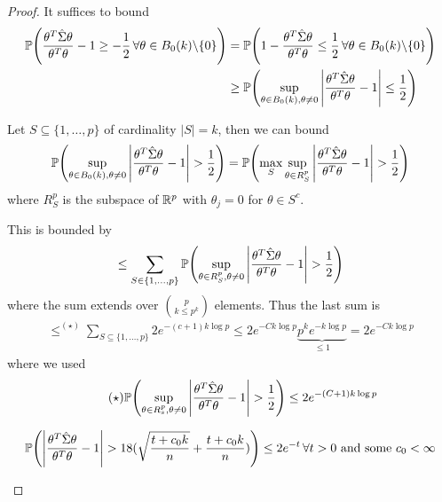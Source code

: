 \begin{proof}
  It suffices to bound
  \begin{align}
    \label{eq:152}
    \Prob{\frac{\theta^{T} \hat \Sigma \theta}{\theta^{T} \theta} -1 \geq
    -\frac{1}{2} \, \forall \theta \in B_{0}(k) \backslash \{ 0 \}} &=
  \Prob{1- \frac{\theta^{T} \hat \Sigma \theta}{\theta^{T} \theta}
    \leq \frac{1}{2} \, \forall \theta \in B_{0}(k) \backslash \{ 0
    \}} \\
  &\geq \Prob{\sup_{\theta \in B_{0}(k), \theta \neq 0} \left|
      \frac{\theta^{T} \hat \Sigma \theta}{\theta^{T} \theta} - 1 \right|
    \leq \frac{1}{2}}
  \end{align}

  Let $S \subseteq  \{ 1, \dots, p \}$ of cardinality $|S| = k$, then
  we can bound
  \begin{align}
    \label{eq:153}
    \Prob{ \sup_{\theta \in B_{0}(k), \theta \neq 0} \left|
        \frac{\theta^{T} \hat \Sigma \theta}{\theta^{T} \theta} - 1
      \right| > \frac{1}{2}} = \Prob{\max_{S} \sup_{\theta \in
        R^{p}_{S}} \left| \frac{\theta^{T} \hat \Sigma
          \theta}{\theta^{T} \theta} - 1 \right| > \frac{1}{2}}
  \end{align} where $R^{p}_{S}$ is the subspace of $\mathbb{R}^{p}$ with
  $\theta_{j} = 0$ for $\theta \in S^{c}$.

  This is bounded by
  \begin{align}
    \label{eq:154}
    \leq \sum_{S \in \{ 1, \dots, p \}} \Prob{\sup_{\theta \in
        R^{p}_{S}, \theta \neq 0} \left| \frac{\theta^{T} \hat \Sigma
          \theta}{\theta^{T} \theta} - 1 \right| > \frac{1}{2}}
  \end{align} where the sum extends over $p \choose k \leq p^{k}$
  elements.  Thus the last sum is
  \begin{align}
    \label{eq:155}
    \leq^{(\star)} \sum_{S \subseteq \{ 1, \dots, p \}} 2e^{-(c+1) k
      \log p} \leq 2 e^{-C k \log p} \underbrace{p^{k} e^{-k \log
        p}}_{\leq 1} = 2e^{-Ck\log p}
  \end{align} where we used
  \begin{align}
    \label{eq:156}
    \tag{$\star$}
    \Prob{\sup_{\theta \in R^{p}_{s}, \theta \neq 0} \left|
        \frac{\theta^{T} \hat \Sigma \theta}{\theta^{T} \theta} - 1
      \right| > \frac{1}{2}} \leq 2 e^{-(C+1)k \log p}
  \end{align}

  \begin{lem}
    \begin{align}
      \label{eq:157}
      \Prob{\left| \frac{\theta^{T} \hat \Sigma \theta}{\theta^{T}
            \theta} - 1 \right| > 18 (\sqrt{\frac{t + c_{0} k}{n}} +
        \frac{t + c_{0} k}{n})} \leq 2e^{-t} \, \text{$\forall t > 0$
        and some $c_{0} < \infty$}
    \end{align}


\end{lem}
\end{proof}
